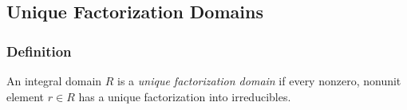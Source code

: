 \subsection{Unique Factorization Domains}\label{ufds}

\subsubsection{Definition}
An integral domain $R$ is a \emph{unique factorization domain} if every nonzero, nonunit element $r \in R$ has a unique factorization
into irreducibles.